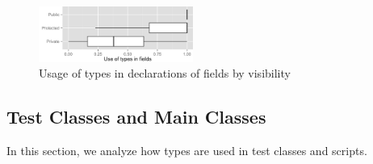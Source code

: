 \documentclass[preprint]{sigplanconf}
\begin{document}
\begin{figure}[h]
\centering 
\includegraphics[width=0.45\textwidth]{../analysis/result/all/boxplots/20_fields.png} 
\caption{Usage of types in declarations of fields by visibility}
\label{fig:all_boxplot_visibility_field} 
\end{figure}

\subsection{Test Classes and Main Classes\label{res-test-scripts}}
In this section, we analyze how types are used in test classes and scripts.
\end{document}
